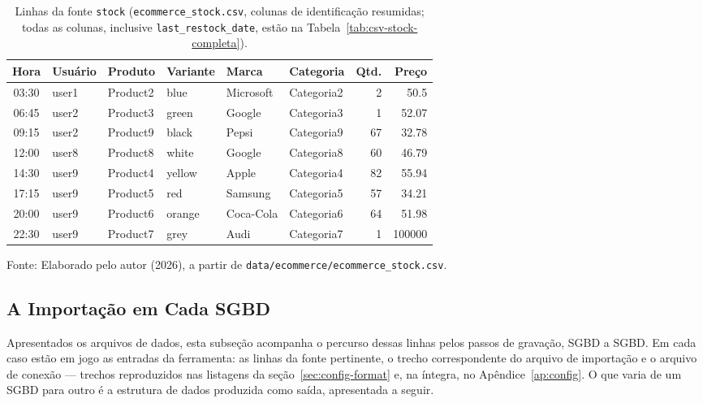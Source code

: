 \begin{table}[H]
  \caption{Linhas da fonte \texttt{stock} (\texttt{ecommerce\_stock.csv}, colunas de identificação resumidas; todas as colunas, inclusive \texttt{last\_restock\_date}, estão na Tabela~\ref{tab:csv-stock-completa}).}
  \label{tab:csv-stock}
  \centering
  \begin{tabular}{c l l l l l r r}
    \toprule
    \textbf{Hora} & \textbf{Usuário} & \textbf{Produto} & \textbf{Variante} & \textbf{Marca} & \textbf{Categoria} & \textbf{Qtd.} & \textbf{Preço} \\
    \midrule
    03:30 & user1 & Product2 & blue   & Microsoft & Categoria2 &  2 & 50.5 \\
    06:45 & user2 & Product3 & green  & Google    & Categoria3 &  1 & 52.07 \\
    09:15 & user2 & Product9 & black  & Pepsi     & Categoria9 & 67 & 32.78 \\
    12:00 & user8 & Product8 & white  & Google    & Categoria8 & 60 & 46.79 \\
    14:30 & user9 & Product4 & yellow & Apple     & Categoria4 & 82 & 55.94 \\
    17:15 & user9 & Product5 & red    & Samsung   & Categoria5 & 57 & 34.21 \\
    20:00 & user9 & Product6 & orange & Coca-Cola & Categoria6 & 64 & 51.98 \\
    22:30 & user9 & Product7 & grey   & Audi      & Categoria7 &  1 & 100000 \\
    \bottomrule
  \end{tabular}
  \par\vspace{4pt}
  {\footnotesize Fonte: Elaborado pelo autor (2026), a partir de \texttt{data/ecommerce/ecommerce\_stock.csv}.}
\end{table}

\subsection{A Importação em Cada SGBD}
\label{sec:importacao-sgbds}

Apresentados os arquivos de dados, esta subseção acompanha o percurso dessas linhas pelos
passos de gravação, SGBD a SGBD. Em cada caso estão em jogo as entradas da ferramenta:
as linhas da fonte pertinente, o trecho correspondente do arquivo de importação e o
arquivo de conexão --- trechos reproduzidos nas listagens da
seção~\ref{sec:config-format} e, na íntegra, no Apêndice~\ref{ap:config}. O que varia
de um SGBD para outro é a estrutura de dados produzida como saída, apresentada a
seguir.

